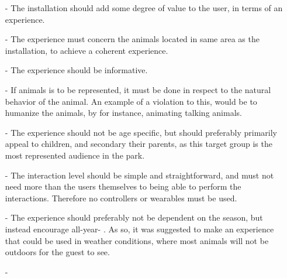 \begin{itemize}
    \item[-] The installation should add some degree of value to the user, in terms of an experience. 
    \item[-] The experience must concern the animals located in same area as the installation, to achieve a coherent experience.
    \item [-] The experience should be informative.
    \item[-] If animals is to be represented, it must be done in respect to the natural behavior of the animal. An example of a violation to this, would be to humanize the animals, by for instance, animating talking animals. 
    \item[-] The experience should not be age specific, but should preferably primarily appeal to children, and secondary their parents, as this target group is the most represented audience in the park. 
    \item[-] The interaction level should be simple and straightforward, and must not need more than the users themselves to being able to perform the interactions. Therefore no controllers or wearables must be used. 
    \item[-] The experience should preferably not be dependent on the season, but instead encourage all-year- . As so, it was suggested to make an experience that could be used in weather conditions, where most animals will not be outdoors for the guest to see.
    \item[-]
\end{itemize}

   










